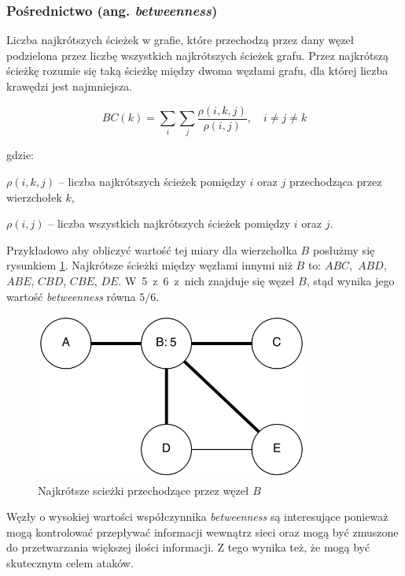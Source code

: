   
\subsubsection{Pośrednictwo (ang. \textit{betweenness}) }  
Liczba najkrótszych ścieżek w grafie, które przechodzą przez dany węzeł podzielona
przez liczbę wszystkich najkrótszych ścieżek grafu. Przez najkrótszą ścieżkę 
rozumie się taką ścieżkę między dwoma węzłami grafu, dla której liczba krawędzi
jest najmniejsza.
  
\begin{equation}
BC(k) = \sum\limits_{i}\sum\limits_{j}\frac{\rho(i, k, j)}{\rho(i, j)}, \quad i \neq j \neq k
\end{equation}

gdzie:

$\rho(i, k, j)$ -- liczba najkrótszych ścieżek pomiędzy $i$ oraz $j$ przechodząca
przez wierzchołek $k$,

$\rho(i, j)$ -- liczba wszystkich najkrótszych ścieżek pomiędzy $i$ oraz $j$.

\bigskip

Przykładowo aby obliczyć wartość tej miary dla wierzchołka $B$ posłużmy się rysunkiem 
\ref{image:betweenness}.
Najkrótsze ścieżki między węzłami innymi niż $B$ to: $ABC,$ $ABD$, $ABE$, $CBD$, $CBE$, $DE$.
\mbox{W 5 z 6 z nich} znajduje się węzeł $B$, stąd wynika jego wartość \textit{betweenness}
równa $5/6$. 

\begin{figure}[ht!]
\centering
\includegraphics[width=90mm]{img/betweenness.png}
\caption{Najkrótsze scieżki przechodzące przez węzeł $B$}
\label{image:betweenness}
\end{figure}

Węzły o wysokiej wartości współczynnika \textit{betweenness} są interesujące
ponieważ mogą kontrolować przepływać informacji wewnątrz sieci oraz
mogą być zmuszone do przetwarzania większej ilości informacji.
Z tego wynika też, że mogą być skutecznym celem ataków.
    
